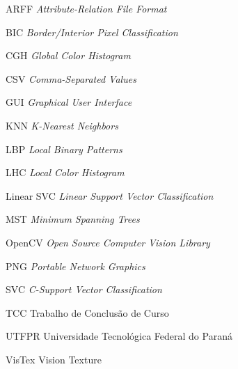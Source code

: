 

\begin{siglas}
    \item[ARFF] \textit{Attribute-Relation File Format}
    \item[BIC] \textit{Border/Interior Pixel Classification}
    \item[CGH] \textit{Global Color Histogram}
    \item[CSV] \textit{Comma-Separated Values}
    \item[GUI] \textit{Graphical User Interface}
    \item[KNN] \textit{K-Nearest Neighbors}
    \item[LBP] \textit{Local Binary Patterns}
    \item[LHC] \textit{Local Color Histogram}
    \item[Linear SVC] \textit{Linear Support Vector Classification}
    \item[MST] \textit{Minimum Spanning Trees}
    \item[OpenCV] \textit{Open Source Computer Vision Library}
    \item[PNG] \textit{Portable Network Graphics}
    \item[SVC] \textit{C-Support Vector Classification}
    \item[TCC] Trabalho de Conclusão de Curso
    \item[UTFPR] Universidade Tecnológica Federal do Paraná
    \item[VisTex] Vision Texture
\end{siglas}

